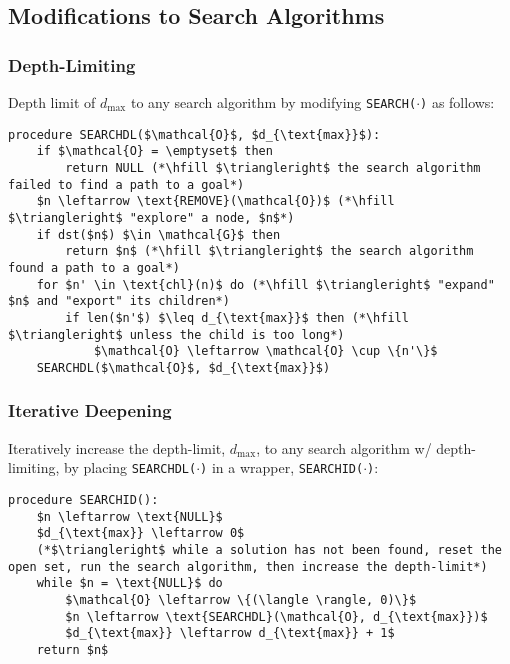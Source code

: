 \subsection{Modifications to Search Algorithms}
\subsubsection{Depth-Limiting}
\begin{definition}
    Depth limit of $d_{\text{max}}$ to any search algorithm by modifying \texttt{SEARCH($\cdot$)} as follows:
\begin{lstlisting}
procedure SEARCHDL($\mathcal{O}$, $d_{\text{max}}$):
    if $\mathcal{O} = \emptyset$ then
        return NULL (*\hfill $\triangleright$ the search algorithm failed to find a path to a goal*)
    $n \leftarrow \text{REMOVE}(\mathcal{O})$ (*\hfill $\triangleright$ "explore" a node, $n$*)
    if dst($n$) $\in \mathcal{G}$ then
        return $n$ (*\hfill $\triangleright$ the search algorithm found a path to a goal*)
    for $n' \in \text{chl}(n)$ do (*\hfill $\triangleright$ "expand" $n$ and "export" its children*)
        if len($n'$) $\leq d_{\text{max}}$ then (*\hfill $\triangleright$ unless the child is too long*)
            $\mathcal{O} \leftarrow \mathcal{O} \cup \{n'\}$
    SEARCHDL($\mathcal{O}$, $d_{\text{max}}$)
\end{lstlisting}

\end{definition}

\subsubsection{Iterative Deepening}
\begin{definition}
    Iteratively increase the depth-limit, $d_{\max}$, to any search algorithm w/ depth-limiting, by placing \texttt{SEARCHDL($\cdot$)} in a wrapper, \texttt{SEARCHID($\cdot$)}:
\begin{lstlisting}
procedure SEARCHID():
    $n \leftarrow \text{NULL}$
    $d_{\text{max}} \leftarrow 0$
    (*$\triangleright$ while a solution has not been found, reset the open set, run the search algorithm, then increase the depth-limit*)
    while $n = \text{NULL}$ do
        $\mathcal{O} \leftarrow \{(\langle \rangle, 0)\}$
        $n \leftarrow \text{SEARCHDL}(\mathcal{O}, d_{\text{max}})$
        $d_{\text{max}} \leftarrow d_{\text{max}} + 1$
    return $n$
\end{lstlisting}
    
\end{definition}

